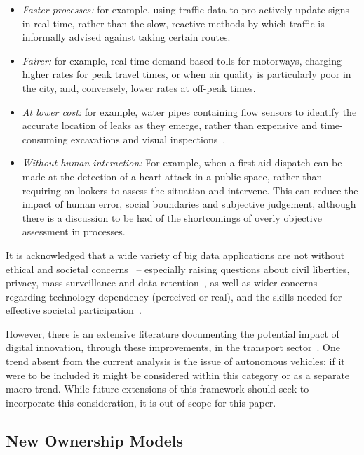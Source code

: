\documentclass[b5paper,10pt]{article}
\begin{document}
\begin{itemize}
\item {\emph{Faster processes:}} for example, using traffic data to
pro-actively update signs in real-time, rather than the slow, reactive
methods by which traffic is informally advised against taking certain
routes.
\item {\emph{Fairer:}} for example, real-time demand-based tolls for
motorways, charging higher rates for peak travel times, or when air
quality is particularly poor in the city, and, conversely, lower rates
at off-peak times.
\item {\emph{At lower cost:}} for example, water pipes containing flow
sensors to identify the accurate location of leaks as they emerge,
rather than expensive and time-consuming excavations and visual
inspections~\citep{cosgrave-et-al:2014}.
\item {\emph{Without human interaction:}} For example, when a first
aid dispatch can be made at the detection of a heart attack in a
public space, rather than requiring on-lookers to assess the situation
and intervene. This can reduce the impact of human error, social
boundaries and subjective judgement, although there is a discussion to
be had of the shortcomings of overly objective assessment in
processes.
\end{itemize}

It is acknowledged that a wide variety of big data applications are
not without ethical and societal
concerns~\citep{bimber:1990,metcalf-et-al:2016} -- especially raising
questions about civil liberties, privacy, mass surveillance and data
retention~\citep{goold:2002,oatley-et-al_dasc:2015,tryfonas-etal-has2016},
as well as wider concerns regarding technology dependency (perceived
or real), and the skills needed for effective societal
participation~\citep{tryfonas+crick:petra2018}.

However, there is an extensive literature documenting the potential
impact of digital innovation, through these improvements, in the
transport sector~\citep{enoch:2015}. One trend absent from the current
analysis is the issue of autonomous vehicles: if it were to be
included it might be considered within this category or as a separate
macro trend. While future extensions of this framework should seek to
incorporate this consideration, it is out of scope for this paper.

\subsection{New Ownership Models}
\end{document}
